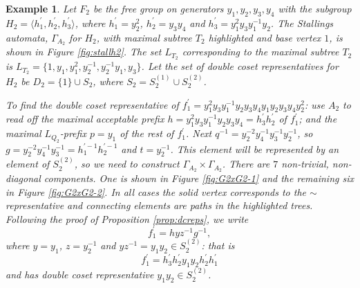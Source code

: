 \documentclass[a4paper,12pt]{article}
\newcommand{\G}{\Gamma }
\newtheorem{exam}[theorem]{Example}
\newenvironment{example}{\begin{exam} \rm}{\end{exam}}
\numberwithin{equation}{section}
\numberwithin{figure}{section}
\newcommand{\la}{\langle}
\newcommand{\ra}{\rangle}
\begin{document}
\begin{example}\label{ex:f_2}
Let $F_2$ be the free group on generators
$y_1,y_2,y_3,y_4$ with the subgroup $H_2 = \la h_1^{\prime},
h_2^{\prime},h_3^{\prime}\ra$, where
$h_1^{\prime}=y_2^2$,
$h_2^{\prime}=y_3y_4$ and
$h_3^{\prime}=y_1^2y_3y_1^{-1}y_2$.
The Stallings automata, $\G_{A_2}$ for $H_2$,
with maximal subtree $T_2$ highlighted and base vertex $1$, is shown
in Figure \ref{fig:stallh2}.
The set $L_{T_2}$ corresponding to the maximal subtree  $T_2$ is
 $L_{T_2}=
\{1, y_1, y_1^2,
y_2^{-1}, y_2^{-1}y_1, y_3 \}$.
Let the set of double coset representatives for $H_2$ be $D_2=\{1\}\cup S_2$, 
where $S_2=S_2^{(1)}
\cup S_2^{(2)}$.

To find the double coset representative 
of $f_1^\prime=y_1^2y_3y_1^{-1}y_2y_3y_4y_1y_2
y_3y_4y_2^2$: use ${A_2}$ to read off the maximal acceptable
prefix $h= y_1^2y_3y_1^{-1}y_2y_3y_4=h_3^\prime h_2^\prime$ of $f_1^\prime$; and  the maximal
$L_{Q_2}$-prefix $p=y_1$ of the rest of $f_1^\prime$.  Next $q^{-1}=
y_2^{-2}y_4^{-1}y_3^{-1}y_2^{-1}$, so $g=y_2^{-2}y_4^{-1}y_3^{-1}
=h_1^{\prime -1}h_2^{\prime -1}$
and $t=y_2^{-1}$. This element will be represented by an element
of $S_2^{(2)}$, so we need to construct $\G_{A_2}\times \G_{A_2}$.
There are $7$  non-trivial, non-diagonal components. One is shown
in Figure \ref{fig:G2xG2-1} and the remaining
six in Figure \ref{fig:G2xG2-2}. In all cases the solid vertex
corresponds to the $\sim$ representative and connecting elements
are paths in the highlighted trees. Following the proof of 
Proposition \ref{prop:dcreps}, 
we write 
\[f_1^\prime=h yz^{-1} g^{-1},\]
where $y=y_1$, $z=y_2^{-1}$ and $yz^{-1}=y_1y_2\in S_2^{(2)}$: that is
\[f_1^\prime=h^\prime_3h_2^\prime y_1y_2 h_2^\prime h_1^\prime\]
and has double coset representative $y_1y_2\in S_2^{(2)}$. 
\end{example}
\end{document}
